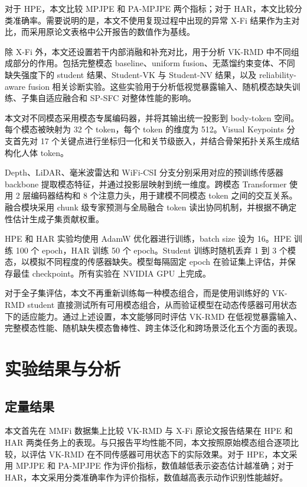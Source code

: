\documentclass[journal]{IEEEtran}
\newcommand{\parahead}[1]{\vspace{0.4em}\noindent{\textbf{#1}}}
\begin{document}
对于 HPE，本文比较 MPJPE 和 PA-MPJPE 两个指标；对于 HAR，本文比较分类准确率。需要说明的是，本文不使用复现过程中出现的异常 X-Fi 结果作为主对比，而采用原论文表格中公开报告的数值作为基线。

除 X-Fi 外，本文还设置若干内部消融和补充对比，用于分析 VK-RMD 中不同组成部分的作用。包括完整模态 baseline、uniform fusion、无蒸馏约束变体、不同缺失强度下的 student 结果、Student-VK 与 Student-NV 结果，以及 reliability-aware fusion 相关诊断实验。这些实验用于分析低视觉暴露输入、随机模态缺失训练、子集自适应融合和 SP-SFC 对整体性能的影响。

\parahead{实现细节。}
本文对不同模态采用模态专属编码器，并将其输出统一投影到 body-token 空间。每个模态被映射为 32 个 token，每个 token 的维度为 512。Visual Keypoints 分支首先对 17 个关键点进行坐标归一化和关节级嵌入，并结合骨架拓扑关系生成结构化人体 token。

Depth、LiDAR、毫米波雷达和 WiFi-CSI 分支分别采用对应的预训练传感器 backbone 提取模态特征，并通过投影层映射到统一维度。跨模态 Transformer 使用 2 层编码器结构和 8 个注意力头，用于建模不同模态 token 之间的交互关系。融合模块采用 chunk 级专家预测与全局融合 token 读出协同机制，并根据不确定性估计生成子集贡献权重。

HPE 和 HAR 实验均使用 AdamW 优化器进行训练，batch size 设为 16。HPE 训练 100 个 epoch，HAR 训练 50 个 epoch。Student 训练时随机丢弃 1 到 3 个模态，以模拟不同程度的传感器缺失。模型每隔固定 epoch 在验证集上评估，并保存最佳 checkpoint。所有实验在 NVIDIA GPU 上完成。

对于全子集评估，本文不再重新训练每一种模态组合，而是使用训练好的 VK-RMD student 直接测试所有可用模态组合，从而验证模型在动态传感器可用状态下的适应能力。通过上述设置，本文能够同时评估 VK-RMD 在低视觉暴露输入、完整模态性能、随机缺失模态鲁棒性、跨主体泛化和跨场景泛化五个方面的表现。


\section{实验结果与分析}

\iffalse

\subsection{定量结果}

本文首先在 MMFi 数据集上比较 VK-RMD 与 X-Fi 原论文报告结果在 HPE 和 HAR 两类任务上的表现。与只报告平均性能不同，本文按照原始模态组合逐项比较，以评估 VK-RMD 在不同传感器可用状态下的实际效果。对于 HPE，本文采用 MPJPE 和 PA-MPJPE 作为评价指标，数值越低表示姿态估计越准确；对于 HAR，本文采用分类准确率作为评价指标，数值越高表示动作识别性能越好。
\end{document}
